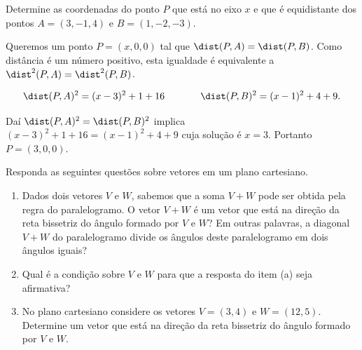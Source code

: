 \begin{problem} 
Determine as coordenadas do ponto $P$ que está no eixo $x$ e que é \linebreak
equidistante dos pontos $A=(3,-1,4)$ e $B=(1,-2,-3)$.
\end{problem}

\begin{solution}
Queremos um ponto $P=(x,0,0)$ tal que $\dist(P,A)=\dist(P,B)$. Como distância é um número positivo, esta igualdade é equivalente a
$\dist^2(P,A)=\dist^2(P,B)$.
  
$$\dist(P,A)^2 = (x-3)^2 + 1 + 16 \ \ \ \ \ \ \ \ \ \ \ \dist(P,B)^2 = (x-1)^2 + 4 + 9.$$

\medskip
Daí $\dist(P,A)^2=\dist(P,B)^2$ implica $(x-3)^2 + 1 + 16=(x-1)^2 + 4 + 9$ cuja solução é $x=3$. Portanto $P=(3,0,0).$ 
\end{solution}




\begin{problem}
Responda as seguintes questões sobre vetores em um plano cartesiano.
\begin{enumerate}
\item[(a)] Dados dois vetores $V$ e $W$, sabemos que a soma $V+W$ pode ser obtida pela regra do paralelogramo. O vetor $V+W$ é um vetor que está na direção da reta bissetriz do ângulo formado por $V$ e $W$? Em outras palavras, a diagonal $V+W$ do paralelogramo divide os ângulos deste paralelogramo em dois ângulos iguais? 

\item[(b)] Qual é a condição sobre $V$ e $W$ para que a resposta do item (a) seja afirmativa?

\item[(c)] No plano cartesiano considere os vetores $V=(3,4)$ e $W=(12,5)$. Determine um vetor que está na direção da reta bissetriz do ângulo formado por $V$ e $W$.
\end{enumerate}
\end{problem}

